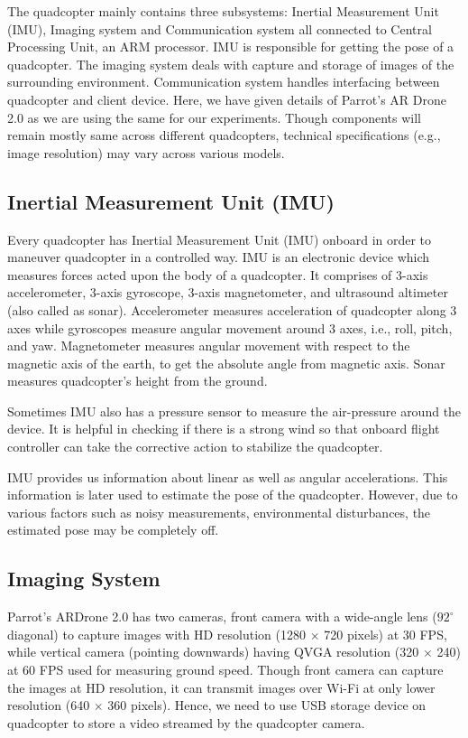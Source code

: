 The quadcopter mainly contains three subsystems: Inertial Measurement Unit (IMU),
Imaging system and Communication system all connected to Central Processing
Unit, an ARM processor. IMU is responsible for getting the pose of a quadcopter.
The imaging system deals with capture and storage of images of the surrounding
environment. Communication system handles interfacing between quadcopter and
client device. Here, we have given details of Parrot's AR Drone 2.0 as we are
using the same for our experiments. Though components will remain mostly same across
different quadcopters, technical specifications (e.g., image resolution) may
vary across various models.

\subsection{Inertial Measurement Unit (IMU)}
Every quadcopter has Inertial Measurement Unit (IMU) onboard in order to maneuver
quadcopter in a controlled way. IMU is an electronic device which measures forces
acted upon the body of a quadcopter. It comprises of 3-axis accelerometer, 3-axis
gyroscope, 3-axis magnetometer, and ultrasound altimeter (also called as sonar).
Accelerometer measures acceleration of quadcopter along 3 axes while gyroscopes
measure angular movement around 3 axes, i.e., roll, pitch, and yaw. Magnetometer
measures angular movement with respect to the magnetic axis of the earth, to get
the absolute angle from magnetic axis. Sonar measures quadcopter's
height from the ground.

Sometimes IMU also has a pressure sensor to measure the air-pressure around the
device. It is helpful in checking if there is a strong wind so that
onboard flight controller can take the corrective action to stabilize the
quadcopter. 

IMU provides us information about linear as well as angular accelerations. This
information is later used to estimate the pose of the quadcopter. However, due
to various factors such as noisy measurements, environmental disturbances, the
estimated pose may be completely off.
 
\subsection{Imaging System}
Parrot's ARDrone 2.0 has two cameras, front camera with a wide-angle lens
($92^{\circ}$ diagonal) to capture images with HD resolution (1280 $\times$ 720
pixels) at 30 FPS, while vertical camera (pointing downwards) having QVGA
resolution (320 $\times$ 240) at 60 FPS used for measuring ground speed.
Though front camera can capture the images at HD resolution, it can transmit
images over Wi-Fi at only  lower resolution (640 $\times$ 360 pixels). Hence, we
need to use USB storage device on quadcopter to store a video streamed by the
quadcopter camera. 

